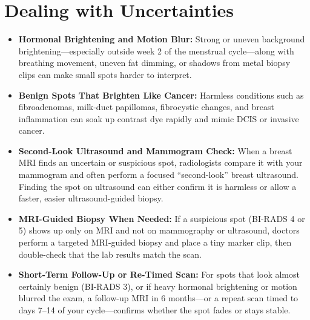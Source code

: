 \section{Dealing with Uncertainties}
\begin{itemize}
\item \textbf{Hormonal Brightening and Motion Blur:} Strong or uneven background brightening---especially outside week 2 of the menstrual cycle---along with breathing movement, uneven fat dimming, or shadows from metal biopsy clips can make small spots harder to interpret.
\item \textbf{Benign Spots That Brighten Like Cancer:} Harmless conditions such as fibroadenomas, milk-duct papillomas, fibrocystic changes, and breast inflammation can soak up contrast dye rapidly and mimic DCIS or invasive cancer.
\item \textbf{Second-Look Ultrasound and Mammogram Check:} When a breast MRI finds an uncertain or suspicious spot, radiologists compare it with your mammogram and often perform a focused ``second-look'' breast ultrasound. Finding the spot on ultrasound can either confirm it is harmless or allow a faster, easier ultrasound-guided biopsy.
\item \textbf{MRI-Guided Biopsy When Needed:} If a suspicious spot (BI-RADS 4 or 5) shows up only on MRI and not on mammography or ultrasound, doctors perform a targeted MRI-guided biopsy and place a tiny marker clip, then double-check that the lab results match the scan.
\item \textbf{Short-Term Follow-Up or Re-Timed Scan:} For spots that look almost certainly benign (BI-RADS 3), or if heavy hormonal brightening or motion blurred the exam, a follow-up MRI in 6 months---or a repeat scan timed to days 7--14 of your cycle---confirms whether the spot fades or stays stable.
\end{itemize}

